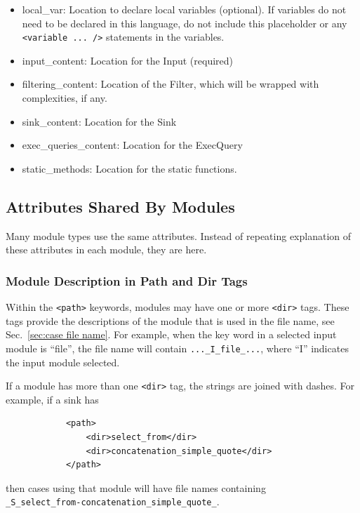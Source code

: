\begin{itemize}
\begin{itemize}
        \item local\_var: Location to declare local variables (optional).  If
          variables do not need to be declared in this language, do not include this
          placeholder or any \verb|<variable ... />| statements in the variables.

        \item input\_content:  Location for the Input (required)

        \item filtering\_content: Location of the Filter, which will be wrapped with
          complexities, if any.

        \item sink\_content:  Location for the Sink

        \item exec\_queries\_content:  Location for the ExecQuery

        \item static\_methods:  Location for the static functions.
    \end{itemize}
\end{itemize}


\subsection{Attributes Shared By Modules}
\label{sec:shared attributes}

Many module types use the same attributes.  Instead of repeating explanation of
these attributes in each module, they are here.

\subsubsection{Module Description in Path and Dir Tags}
\label{sec:module description}

Within the \verb|<path>| keywords, modules may have one or more \verb|<dir>| tags.
These tags provide the descriptions of the module that is used in the file name, see
Sec.~\ref{sec:case file name}.  For example, when the key word in a selected input
module is ``file'', the file name will contain \verb|..._I_file_...|, where ``I''
indicates the input module selected.

If a module has more than one \verb|<dir>| tag, the strings are joined with dashes.
For example, if a sink has
\begin{verbatim}
            <path>
                <dir>select_from</dir>
                <dir>concatenation_simple_quote</dir>
            </path>
\end{verbatim}
then cases using that module will have file names containing \\
\verb|_S_select_from-concatenation_simple_quote_|.

